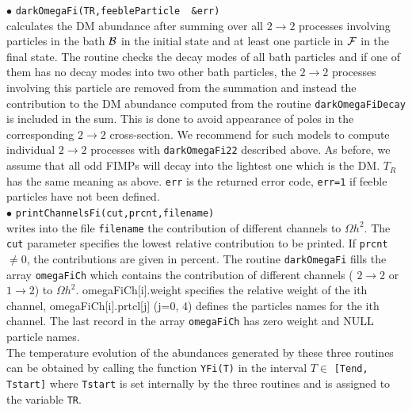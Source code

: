 \documentclass[12pt,a4paper]{article}
\begin{document}
\noindent
$\bullet$ \verb|darkOmegaFi(TR,feebleParticle  &err)|  \\
calculates the  DM abundance after summing over all 
$2\to2$ processes involving  particles in the bath ${\cal B}$ in the initial state  and at least one particle in ${\cal F}$  in the final state. The routine checks the decay modes of all bath particles and if one of them has no decay modes into two other bath particles, the $2\to2$ processes involving this particle are removed from the summation and instead the contribution to the DM abundance computed from the routine \verb|darkOmegaFiDecay| is included in the sum.  This is done to avoid appearance of poles in the corresponding $2\to2$ cross-section. We recommend for such models to compute individual $2\to2$ processes with \verb|darkOmegaFi22| described above. As before, we assume that all odd FIMPs will decay into the lightest one which is the DM. $T_R$    has the same meaning as above.
{\tt err} is the returned error code, \verb|err=1| if feeble particles have not been defined. \\

\noindent
$\bullet$ \verb|printChannelsFi(cut,prcnt,filename)|  \\
writes into the file \verb|filename| the contribution of different channels to $\Omega h^2$. The \verb|cut| parameter specifies the lowest relative contribution to be printed.   If
\verb|prcnt| $\neq 0$, the contributions are given in percent.   
The routine \verb|darkOmegaFi| fills  the array      \verb|omegaFiCh| which contains the contribution of different channels ( $2\rightarrow 2$ or $1\rightarrow 2$) to $\Omega h^2$.
omegaFiCh[i].weight specifies the relative weight of the ith channel,
omegaFiCh[i].prtcl[j] (j=0, 4) defines the particles names for the ith channel.
The last record in the array  \verb|omegaFiCh| has zero weight and NULL particle names.\\


The  temperature evolution of the abundances generated by these three routines can be obtained by calling  the function {\tt YFi(T)} in the interval $T\in$ \verb|[Tend, Tstart]|    
where {\tt Tstart} is set internally by the three routines and is assigned to the variable {\tt TR}.
\end{document}
